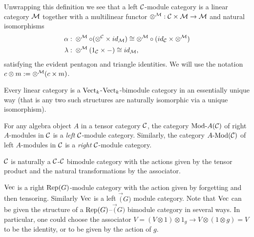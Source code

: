\documentclass{amsart}
\begin{document}
Unwrapping this definition we see that a left $\cC$-module category is a linear category $\cM$ together with a multilinear functor $\otimes^{\cM}: \cC \times \cM \to \cM$ and natural isomorphisms
	\begin{align*}
		\alpha: & \;    \otimes^{\cM} \circ (\otimes^{\cC} \times id_{\cM}) \cong  \otimes^{\cM} \circ (id_{\cC} \times \otimes^{\cM}) \\
		\lambda: & \; \otimes^{\cM}(1_{\cC} \times -) \cong id_{\cM},
	\end{align*}
	satisfying the evident pentagon and triangle identities.  We will use the notation $c \otimes m := \otimes^\cM(c \times m)$.

\begin{example}
	Every linear category is a $\Vect_k$-$\Vect_k$-bimodule category in an essentially unique way (that is any two such structures are naturally isomorphic via a unique isomorphism). %
\end{example}

\begin{example} \label{ex:ModulesAreModules}
	For any algebra object $A$ in a tensor category $\cC$, the category $\Mod{}{A}(\cC)$ of right $A$-modules in $\cC$ is a \emph{left} $\cC$-module category.  Similarly, the category $\Mod{A}{}(\cC)$ of left $A$-modules in $\cC$ is a \emph{right} $\cC$-module category.
\end{example}

\begin{example}
$\cC$ is naturally a $\cC$-$\cC$ bimodule category with the actions given by the tensor product and the natural transformations by the associator.
\end{example}

\begin{example}
$\Vec$ is a right $\Rep(G)$-module category with the action given by forgetting and then tensoring.  Similarly $\Vec$ is a left $\Vec(G)$ module category.  Note that $\Vec$ can be given the structure of a $\Rep(G)$--$\Vec(G)$ bimodule category in several ways.  In particular, one could choose the associator $V = (V \otimes 1) \otimes 1_g \rightarrow V \otimes (1 \otimes g) = V$ to be the identity, or to be given by the action of $g$.
\end{example}
\end{document}
